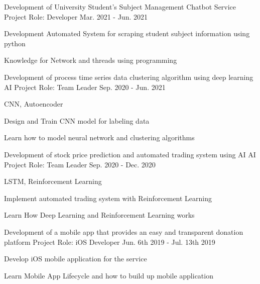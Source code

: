 \begin{cventries}
  \cventry
    {Development of University Student's Subject Management Chatbot Service} %
    {Project} %
    {Role: Developer} %
    {Mar. 2021 - Jun. 2021} %
    {
      \begin{cvitems} %
        \item {Development Automated System for scraping student subject information using python}
        \item {Knowledge for Network and threads using programming}
      \end{cvitems}
    }
    
  \cventry
    {Development of process time series data clustering algorithm using deep learning} %
    {AI Project} %
    {Role: Team Leader} %
    {Sep. 2020 - Jun. 2021} %
    {
      \begin{cvitems} %
        \item {CNN, Autoencoder}
        \item {Design and Train CNN model for labeling data}
        \item {Learn how to model neural network and clustering algorithms}
      \end{cvitems}
    }
    
  \cventry
    {Development of stock price prediction and automated trading system using AI} %
    {AI Project} %
    {Role: Team Leader} %
    {Sep. 2020 - Dec. 2020} %
    {
      \begin{cvitems} %
        \item {LSTM, Reinforcement Learning}
        \item {Implement automated trading system with Reinforcement Learning}
        \item {Learn How Deep Learning and Reinforcement Learning works}
      \end{cvitems}
    }
    
  \cventry
    {Development of a mobile app that provides an easy and transparent donation platform} %
    {Project} %
    {Role: iOS Developer} %
    {Jun. 6th 2019 - Jul. 13th 2019} %
    {
      \begin{cvitems} %
        \item {Develop iOS mobile application for the service}
        \item {Learn Mobile App Lifecycle and how to build up mobile application}
      \end{cvitems}
    }
    

\end{cventries}
